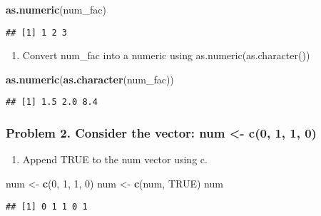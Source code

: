 \documentclass[]{article}
\newenvironment{Shaded}{\begin{snugshade}}{\end{snugshade}}
\newcommand{\DecValTok}[1]{\textcolor[rgb]{0.00,0.00,0.81}{#1}}
\newcommand{\KeywordTok}[1]{\textcolor[rgb]{0.13,0.29,0.53}{\textbf{#1}}}
\newcommand{\NormalTok}[1]{#1}
\newcommand{\OtherTok}[1]{\textcolor[rgb]{0.56,0.35,0.01}{#1}}
\newcommand{\StringTok}[1]{\textcolor[rgb]{0.31,0.60,0.02}{#1}}
\providecommand{\tightlist}{%
  \setlength{\itemsep}{0pt}\setlength{\parskip}{0pt}}
\begin{document}
\begin{Shaded}
\begin{Highlighting}[]
\KeywordTok{as.numeric}\NormalTok{(num_fac)}
\end{Highlighting}
\end{Shaded}

\begin{verbatim}
## [1] 1 2 3
\end{verbatim}

\begin{enumerate}
\def\labelenumi{\alph{enumi}.}
\setcounter{enumi}{3}
\tightlist
\item
  Convert num\_fac into a numeric using as.numeric(as.character())
\end{enumerate}

\begin{Shaded}
\begin{Highlighting}[]
\KeywordTok{as.numeric}\NormalTok{(}\KeywordTok{as.character}\NormalTok{(num_fac))}
\end{Highlighting}
\end{Shaded}

\begin{verbatim}
## [1] 1.5 2.0 8.4
\end{verbatim}

\hypertarget{problem-2.-consider-the-vector-num---c0-1-1-0}{%
\subsubsection{Problem 2. Consider the vector: num \textless{}- c(0, 1,
1, 0)}\label{problem-2.-consider-the-vector-num---c0-1-1-0}}

\begin{enumerate}
\def\labelenumi{\alph{enumi}.}
\tightlist
\item
  Append TRUE to the num vector using c.
\end{enumerate}

\begin{Shaded}
\begin{Highlighting}[]
\NormalTok{num <-}\StringTok{ }\KeywordTok{c}\NormalTok{(}\DecValTok{0}\NormalTok{, }\DecValTok{1}\NormalTok{, }\DecValTok{1}\NormalTok{, }\DecValTok{0}\NormalTok{) }
\NormalTok{num <-}\StringTok{ }\KeywordTok{c}\NormalTok{(num, }\OtherTok{TRUE}\NormalTok{)}
\NormalTok{num}
\end{Highlighting}
\end{Shaded}

\begin{verbatim}
## [1] 0 1 1 0 1
\end{verbatim}
\end{document}
